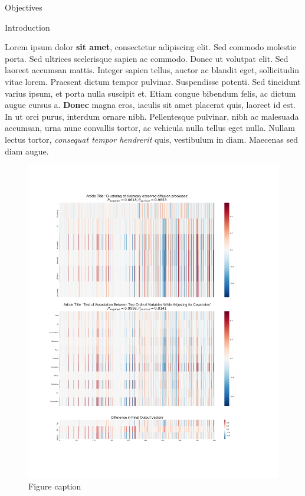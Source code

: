\documentclass[final]{beamer}
\newlength{\onecolwid}
\begin{document}
\begin{frame}[t]
\begin{columns}[t]
\begin{column}{\onecolwid}
\begin{alertblock}{Objectives}
			\end{alertblock}
			
			
			\begin{block}{Introduction}
				
				Lorem ipsum dolor \textbf{sit amet}, consectetur adipiscing elit. Sed commodo molestie porta. Sed ultrices scelerisque sapien ac commodo. Donec ut volutpat elit. Sed laoreet accumsan mattis. Integer sapien tellus, auctor ac blandit eget, sollicitudin vitae lorem. Praesent dictum tempor pulvinar. Suspendisse potenti. Sed tincidunt varius ipsum, et porta nulla suscipit et. Etiam congue bibendum felis, ac dictum augue cursus a. \textbf{Donec} magna eros, iaculis sit amet placerat quis, laoreet id est. In ut orci purus, interdum ornare nibh. Pellentesque pulvinar, nibh ac malesuada accumsan, urna nunc convallis tortor, ac vehicula nulla tellus eget nulla. Nullam lectus tortor, \textit{consequat tempor hendrerit} quis, vestibulum in diam. Maecenas sed diam augue.
				
				
			\end{block}
			
			
			\begin{figure}
				\includegraphics[width=0.8\linewidth]{comparisonTitle.pdf}
				\caption{Figure caption}
			\end{figure}
			

\end{column}
\end{columns}
\end{frame}
\end{document}
